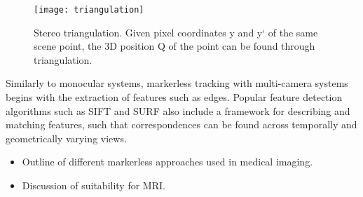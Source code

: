 \documentclass[class=article, crop=false]{standalone}
\begin{document}
\begin{figure}
	\centering
	\texttt{[image: triangulation]}
	\caption{Stereo triangulation. Given pixel coordinates y and y` of the same scene point, the 3D position Q of the point can be found through triangulation.}
	\label{triangulation}
\end{figure}

\par 
Similarly to monocular systems, markerless tracking with multi-camera systems begins with the extraction of features such as edges. Popular feature detection algorithms such as SIFT and SURF also include a framework for describing and matching features, such that correspondences can be found across temporally and geometrically varying views.

\begin{itemize}
	\item Outline of different markerless approaches used in medical imaging.
	\item Discussion of suitability for MRI.
\end{itemize}
\end{document}
